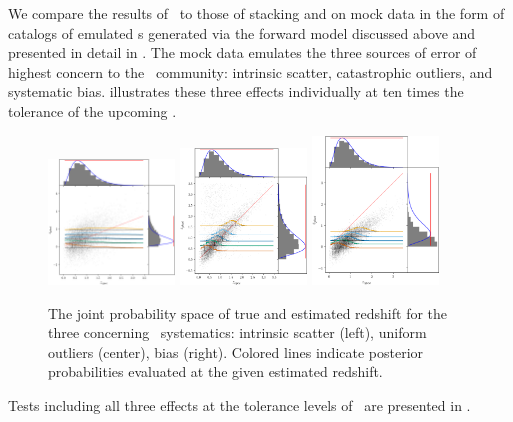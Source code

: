We compare the results of \Chippr\ to those of stacking and  on mock data in the form of catalogs of emulated \pzpdf s generated via the forward model discussed above and presented in detail in .
The mock data emulates the three sources of error of highest concern to the \pz\ community: intrinsic scatter, catastrophic outliers, and systematic bias.
 illustrates these three effects individually at ten times the tolerance of the upcoming \lsst.
\begin{figure}
	\begin{center}
		\includegraphics[width=0.3\textwidth]{figures/chippr/hivarsigmas_scatter.png}
		\includegraphics[width=0.3\textwidth]{figures/chippr/uouthi_scatter.png}
		\includegraphics[width=0.3\textwidth]{figures/chippr/neghivarbias_scatter.png}
		\caption{The joint probability space of true and estimated redshift for the three concerning \pz\ systematics: intrinsic scatter (left), uniform outliers (center), bias (right).
			Colored lines indicate posterior probabilities evaluated at the given estimated redshift.
		}
	\end{center}
\end{figure}
Tests including all three effects at the tolerance levels of \lsst\ are presented in .

